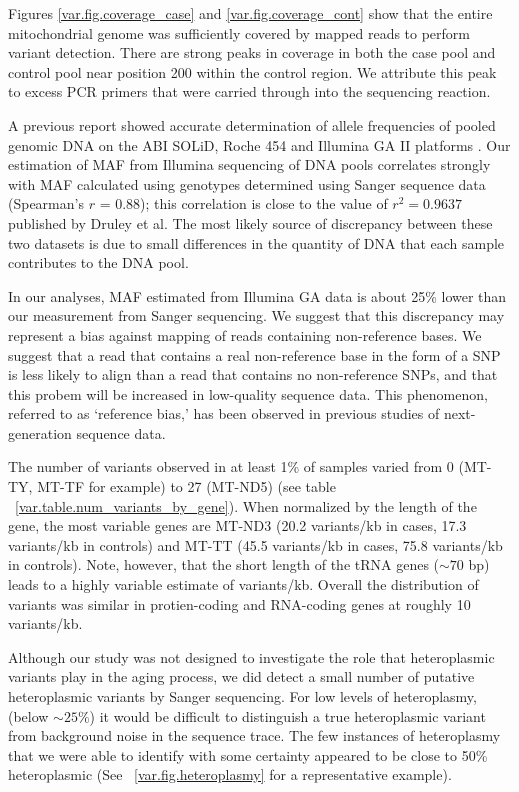 Figures \ref{var.fig.coverage_case} and \ref{var.fig.coverage_cont} show that the entire mitochondrial genome was sufficiently covered by mapped reads to perform variant detection.  There are strong peaks in coverage in both the case pool and control pool near position 200 within the control region.  We attribute this peak to excess PCR primers that were carried through into the sequencing reaction.

A previous report showed accurate determination of allele frequencies of pooled genomic DNA on the ABI SOLiD, Roche 454 and Illumina GA II platforms \cite{druley2009quantification}. Our estimation of MAF from Illumina sequencing of DNA pools correlates strongly with MAF calculated using genotypes determined using Sanger sequence data (Spearman's $r$ = 0.88); this correlation is close to the value of $r^{2} = 0.9637$ published by Druley et al\cite{druley2009quantification}. The most likely source of discrepancy between these two datasets is due to small differences in the quantity of DNA that each sample contributes to the DNA pool. 

In our analyses, MAF estimated from Illumina GA data is about 25\% lower than our measurement from Sanger sequencing. We suggest that this discrepancy may represent a bias against mapping of reads containing non-reference bases. We suggest that a read that contains a real non-reference base in the form of a SNP is less likely to align than a read that contains no non-reference SNPs, and that this probem will be increased in low-quality sequence data.  This phenomenon, referred to as `reference bias,' has been observed in previous studies of next-generation sequence data\cite{degner2009effect}.

The number of variants observed in at least 1\% of samples varied from 0 (MT-TY, MT-TF for example) to 27 (MT-ND5) (see table ~\ref{var.table.num_variants_by_gene}).  When normalized by the length of the gene, the most variable genes are MT-ND3 (20.2 variants/kb in cases, 17.3 variants/kb in controls) and MT-TT (45.5 variants/kb in cases, 75.8 variants/kb in controls).  Note, however, that the short length of the tRNA genes ($\sim 70$ bp) leads to a highly variable estimate of variants/kb.  Overall the distribution of variants was similar in protien-coding and RNA-coding genes at roughly 10 variants/kb.

Although our study was not designed to investigate the role that heteroplasmic variants play in the aging process, we did detect a small number of putative heteroplasmic variants by Sanger sequencing.  For low levels of heteroplasmy, (below $\sim 25\%$) it would be difficult to distinguish a true heteroplasmic variant from background noise in the sequence trace.  The few instances of heteroplasmy that we were able to identify with some certainty appeared to be close to 50\% heteroplasmic (See ~\ref{var.fig.heteroplasmy} for a representative example).

\newpage
